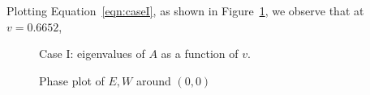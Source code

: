 \documentclass{article}[12pt]
\theoremstyle{plain}
\begin{document}
Plotting Equation~\ref{eqn:caseI}, as shown in Figure~\ref{fig:caseI}, we observe that at $v=0.6652$, 
\begin{figure}[htb]
\begin{center}
\caption{Case I: eigenvalues of $A$ as a function of $v$.}
\label{fig:caseI}
\end{center}
\end{figure}

\begin{figure}[htb]
\begin{center}
\subfigure[Plot of $E$ vs $\xi$]{\texttt{[image: ME19]}}
\subfigure[Plot of $W$ vs $\xi$]{\texttt{[image: MW19]}}
\caption{Phase plot of $E,W$ around $(0,0)$}
\label{fig:ME19}
\end{center}
\end{figure}
\end{document}
